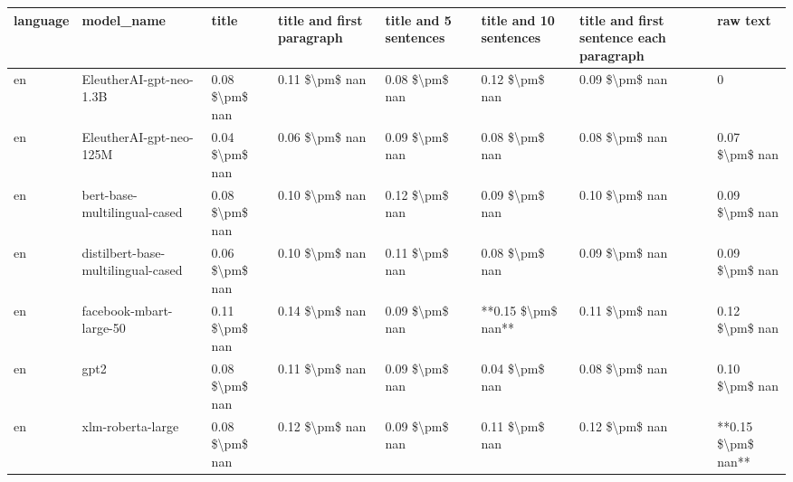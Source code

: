\begin{tabular}{llllllll}
\toprule
language &                         model\_name &          title & title and first paragraph & title and 5 sentences & title and 10 sentences & title and first sentence each paragraph &           raw text \\
\midrule
      en &            EleutherAI-gpt-neo-1.3B & 0.08 \$\textbackslash pm\$ nan &            0.11 \$\textbackslash pm\$ nan &        0.08 \$\textbackslash pm\$ nan &         0.12 \$\textbackslash pm\$ nan &                          0.09 \$\textbackslash pm\$ nan &                  0 \\
      en &            EleutherAI-gpt-neo-125M & 0.04 \$\textbackslash pm\$ nan &            0.06 \$\textbackslash pm\$ nan &        0.09 \$\textbackslash pm\$ nan &         0.08 \$\textbackslash pm\$ nan &                          0.08 \$\textbackslash pm\$ nan &     0.07 \$\textbackslash pm\$ nan \\
      en &       bert-base-multilingual-cased & 0.08 \$\textbackslash pm\$ nan &            0.10 \$\textbackslash pm\$ nan &        0.12 \$\textbackslash pm\$ nan &         0.09 \$\textbackslash pm\$ nan &                          0.10 \$\textbackslash pm\$ nan &     0.09 \$\textbackslash pm\$ nan \\
      en & distilbert-base-multilingual-cased & 0.06 \$\textbackslash pm\$ nan &            0.10 \$\textbackslash pm\$ nan &        0.11 \$\textbackslash pm\$ nan &         0.08 \$\textbackslash pm\$ nan &                          0.09 \$\textbackslash pm\$ nan &     0.09 \$\textbackslash pm\$ nan \\
      en &            facebook-mbart-large-50 & 0.11 \$\textbackslash pm\$ nan &            0.14 \$\textbackslash pm\$ nan &        0.09 \$\textbackslash pm\$ nan &     **0.15 \$\textbackslash pm\$ nan** &                          0.11 \$\textbackslash pm\$ nan &     0.12 \$\textbackslash pm\$ nan \\
      en &                               gpt2 & 0.08 \$\textbackslash pm\$ nan &            0.11 \$\textbackslash pm\$ nan &        0.09 \$\textbackslash pm\$ nan &         0.04 \$\textbackslash pm\$ nan &                          0.08 \$\textbackslash pm\$ nan &     0.10 \$\textbackslash pm\$ nan \\
      en &                  xlm-roberta-large & 0.08 \$\textbackslash pm\$ nan &            0.12 \$\textbackslash pm\$ nan &        0.09 \$\textbackslash pm\$ nan &         0.11 \$\textbackslash pm\$ nan &                          0.12 \$\textbackslash pm\$ nan & **0.15 \$\textbackslash pm\$ nan** \\

\end{tabular}
